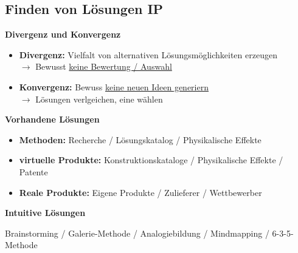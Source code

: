 \subsection{Finden von Lösungen \hfill IP}
    \textbf{Divergenz und Konvergenz}
    \begin{scriptsize}
        \begin{itemize}
            \item \textbf{Divergenz:} Vielfalt von alternativen Lösungsmöglichkeiten erzeugen \\$\to$ Bewusst \underline{keine Bewertung / Auswahl}
            \item \textbf{Konvergenz:} Bewuss \underline{keine neuen Ideen generiern} \\$\to$ Lösungen verlgeichen, eine wählen
        \end{itemize}
    \end{scriptsize}

    \textbf{Vorhandene Lösungen}
    \begin{scriptsize}
        \begin{itemize}
            \item \textbf{Methoden:} Recherche / Lösungskatalog / Physikalische Effekte
            \item \textbf{virtuelle Produkte:} Konstruktionskataloge / Physikalische Effekte / \\Patente
            \item \textbf{Reale Produkte:} Eigene Produkte / Zulieferer / Wettbewerber
        \end{itemize}
    \end{scriptsize}

    \textbf{Intuitive Lösungen}\\
    \begin{scriptsize}
        Brainstorming / Galerie-Methode / Analogiebildung / Mindmapping / 6-3-5-Methode
    \end{scriptsize}